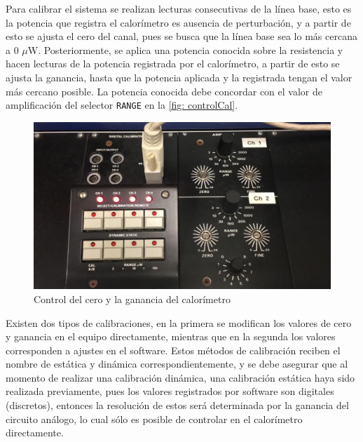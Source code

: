 	Para calibrar el sistema se realizan lecturas consecutivas de la línea base, esto es la potencia que registra el calorímetro es ausencia de perturbación, y a partir de esto se ajusta el cero del canal, pues se busca que la línea base sea lo más cercana a 0 $\mu$W. Posteriormente, se aplica una potencia conocida sobre la resistencia y hacen lecturas de la potencia registrada por el calorímetro, a partir de esto se ajusta la ganancia, hasta que la potencia aplicada y la registrada tengan el valor más cercano posible. La potencia conocida debe concordar con el valor de amplificación del selector \texttt{RANGE} en la \autoref{fig: controlCal}.
	\begin{figure}[h]
		\centering
		\includegraphics[width=0.7\linewidth]{Figures/controlCal}
		\caption{Control del cero y la ganancia del calor\'imetro}
		\label{fig: controlCal}
	\end{figure}
	
	Existen dos tipos de calibraciones, en la primera se modifican los valores de cero y ganancia en el equipo directamente, mientras que en la segunda los valores corresponden a ajustes en el software. Estos métodos de calibración reciben el nombre de estática y dinámica correspondientemente, y se debe asegurar que al momento de realizar una calibración dinámica, una calibración estática haya sido realizada previamente, pues los valores registrados por software son digitales (discretos), entonces la resolución de estos será determinada por la ganancia del circuito análogo, lo cual sólo es posible de controlar en el calorímetro directamente.
	 
